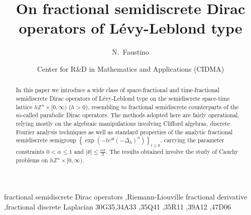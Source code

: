 \documentclass{elsarticle}
\newcommand{\BZ}{{\mathbb Z}}
\begin{document}
\begin{frontmatter}

\title{On fractional semidiscrete Dirac operators of L\'evy-Leblond type}

\author{N.~Faustino}
\address{Department of Mathematics, University of Aveiro}

\author[mymainaddress]{Center for R\&D in Mathematics and Applications (CIDMA)}


\address[mymainaddress]{Campus Universit\'ario de Santiago, 3810-193 Aveiro, Portugal}

\begin{abstract}
	In this paper we introduce a wide class of space-fractional and time-fractional semidiscrete Dirac operators of L\'evy-Leblond type on the semidiscrete space-time lattice $h\BZ^n\times[0,\infty)$ ($h>0$), resembling to fractional semidiscrete counterparts of the so-called parabolic Dirac operators.
	The methods adopted here are fairly operational, relying mostly on the algebraic manipulations involving Clifford algebras, discrete Fourier analysis techniques as well as standard properties of the analytic fractional semidiscrete semigroup $\left\{\exp(-te^{i\theta}(-\Delta_h)^{\alpha})\right\}_{t\geq 0}$, carrying the parameter constraints $0<\alpha\leq 1$ and $|\theta|\leq \frac{\alpha \pi}{2}$. The results obtained involve the study of Cauchy problems on $h\BZ^n\times[0,\infty)$.
\end{abstract}

\begin{keyword}
fractional semidiscrete Dirac operators \sep Riemann-Liouville fractional derivative \sep fractional discrete Laplacian
\MSC[2020] 30G35\sep 34A33 \sep 35Q41 \sep 35R11 \sep 39A12 \sep 47D06
\end{keyword}

\end{frontmatter}
\end{document}
